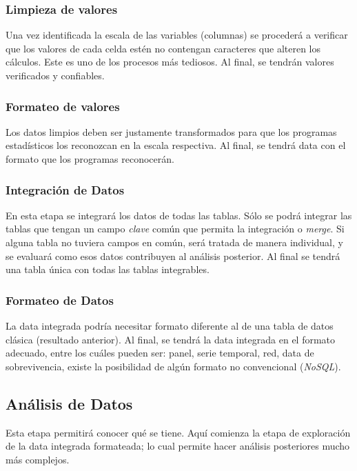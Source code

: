 \documentclass{article}
\begin{document}
\subsubsection{Limpieza de valores}

Una vez identificada la escala de las variables (columnas) se procederá a verificar que los valores de cada celda estén no contengan caracteres que alteren los cálculos. Este es uno de los procesos más tediosos. Al final, se tendrán valores verificados y confiables.

\subsubsection{Formateo de valores}
Los datos limpios deben ser justamente transformados para que los programas estadísticos los reconozcan en la escala respectiva. Al final, se tendrá data con el formato que los programas reconocerán.

\subsubsection{Integración de Datos}
En esta etapa se integrará los datos de todas las tablas. Sólo se podrá integrar las tablas que tengan un campo \emph{clave} común que permita la integración o \emph{merge}. Si alguna tabla no tuviera campos en común, será tratada de manera individual, y se evaluará como esos datos contribuyen al análisis posterior. Al final se tendrá una tabla única con todas las tablas integrables.

\subsubsection{Formateo de Datos}
La data integrada podría necesitar formato diferente al de una tabla de datos clásica (resultado anterior). Al final, se tendrá la data integrada en el formato adecuado, entre los cuáles pueden ser: panel, serie temporal, red, data de sobrevivencia, existe la posibilidad de algún formato no convencional (\emph{NoSQL}).

\subsection{Análisis de Datos}

Esta etapa permitirá conocer qué se tiene. Aquí comienza la etapa de exploración de la data integrada formateada; lo cual permite hacer análisis posteriores mucho más complejos.
\end{document}
